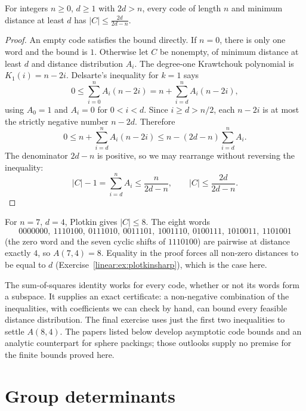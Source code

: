 \begin{corollary}\label{linear:cor:plotkin}
For integers $n\ge0$, $d\ge1$ with $2d>n$, every code of length $n$ and
minimum distance at least $d$ has $|C|\le\frac{2d}{2d-n}$.
\end{corollary}
\begin{proof}
An empty code satisfies the bound directly. If $n=0$, there is only one word
and the bound is $1$. Otherwise let $C$ be nonempty, of minimum distance
at least $d$ and distance distribution
$A_i$. The degree-one Krawtchouk
polynomial is $K_1(i)=n-2i$.
Delsarte's inequality for $k=1$ says
\[
0\le\sum_{i=0}^n A_i(n-2i)
 =n+\sum_{i=d}^n A_i(n-2i),
\]
using $A_0=1$ and $A_i=0$ for
$0<i<d$. Since $i\ge d>n/2$,
each $n-2i$ is at most the
strictly negative number $n-2d$.
Therefore
\[
0\le n+\sum_{i=d}^n A_i(n-2i)
 \le n-(2d-n)\sum_{i=d}^n A_i.
\]
The denominator $2d-n$ is positive,
so we may rearrange without reversing
the inequality:
\[
|C|-1=\sum_{i=d}^n A_i
\le\frac{n}{2d-n},
\qquad
|C|\le\frac{2d}{2d-n}.
\]
\end{proof}

\begin{example}\label{linear:exa:simplex}
For $n=7$, $d=4$, Plotkin gives $|C|\le8$. The eight words
\[
0000000,\ 1110100,\ 0111010,\ 0011101,\ 1001110,\ 0100111,\ 1010011,\ 1101001
\]
(the zero word and the seven cyclic shifts of $1110100$) are pairwise at distance exactly $4$, so $A(7,4)=8$. Equality in the proof
forces all non-zero distances to be equal to $d$ (Exercise~\ref{linear:ex:plotkinsharp}), which is the case here.
\end{example}

\begin{remark}
The sum-of-squares identity works for every code, whether or not its words
form a subspace. It supplies an exact certificate: a non-negative combination
of the inequalities, with coefficients we can check by hand, can bound every
feasible distance distribution. The final exercise uses just the first two
inequalities to settle $A(8,4)$. The papers listed below develop asymptotic code
bounds and an analytic counterpart for sphere packings; those outlooks supply
no premise for the finite bounds proved here.
\end{remark}

\section{Group determinants}

